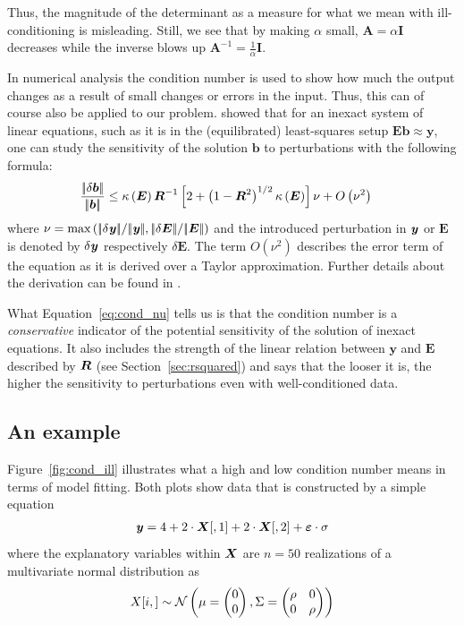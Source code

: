 \documentclass[11pt,a4paper,twoside]{book}\usepackage[]{graphicx}\usepackage[]{xcolor}
\begin{document}
Thus, the magnitude of the determinant as a measure for what we mean with ill-conditioning is misleading. Still, we see that by making $\alpha$ small, $\boldsymbol{A}=\alpha\boldsymbol{I}$ decreases while the inverse blows up $\boldsymbol{A}^{-1}=\frac{1}{\alpha}\boldsymbol{I}$. 

In numerical analysis the condition number is used to show how much the output changes as a result of small changes or errors in the input. Thus, this can of course also be applied to our problem. \cite{Belsley1991} showed that for an inexact system of linear equations, such as it is in the (equilibrated) least-squares setup $\boldsymbol{Eb}\approx \boldsymbol{y}$, one can study the sensitivity of the solution $\boldsymbol{b}$ to perturbations with the following formula:
\begin{align}
\frac{|\!|\delta\boldsymbol{b}|\!|}{|\!|\boldsymbol{b}|\!|}&\leq \kappa\left(\boldsymbol{E}\right){\boldsymbol{R}}^{-1}\left[2+\left(1-{\boldsymbol{R}}^2\right)^{1/2}\kappa\left(\boldsymbol{E}\right)\right]\nu+O\left(\nu^2\right) 
\label{eq:cond_nu}
\end{align}
 where $\nu=\text{max}\left(\|\delta \y\|/\| \y\|, \|\delta \boldsymbol{E}\|/\| \boldsymbol{E}\| \right)$ and the introduced perturbation in ${\textbf{\textit{y}}}$ or $\boldsymbol{E}$ is denoted by $\delta{\textbf{\textit{y}}}$ respectively $\delta\boldsymbol{E}$. The term $O\left(\nu^2\right)$ describes the error term of the equation as it is derived over a Taylor approximation. Further details about the derivation can be found in \cite{golub1983matrix}. 

What Equation~\eqref{eq:cond_nu} tells us is that the condition number is a \textit{conservative} indicator of the potential sensitivity of the solution of inexact equations. It also includes the strength of the linear relation between $\boldsymbol{y}$ and $\boldsymbol{E}$ described by ${\boldsymbol{R}}$ (see Section~\ref{sec:rsquared}) and says that the looser it is, the higher the sensitivity to perturbations even with well-conditioned data.


\subsection{An example}\label{sec:example}



Figure~\ref{fig:cond_ill} illustrates what a high and low condition number means in terms of model fitting. Both plots show data that is constructed by a simple equation
\begin{align}
{\textbf{\textit{y}}}=4+2\cdot{\boldsymbol{X}}[,1]+2\cdot{\boldsymbol{X}}[,2]+\boldsymbol{\varepsilon}\cdot \sigma \label{eq:simplemodel}
\end{align}
where the explanatory variables within ${\boldsymbol{X}}$ are $n=50$ realizations of a multivariate normal distribution as 
$$X[i,]\sim\operatorname{\mathcal{N}}\left(\mu = \begin{pmatrix} 0 \\ 0 \end{pmatrix}, \Sigma = \begin{pmatrix} \rho & 0 \\ 0&\rho \end{pmatrix}\right)$$
\end{document}
